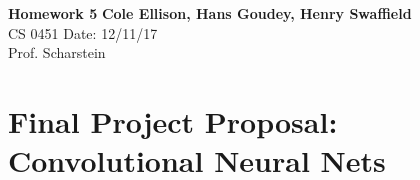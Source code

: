 \documentclass[a4paper, 11pt]{article}
\begin{document}
\noindent
\large\textbf{Homework 5} \hfill \textbf{Cole Ellison, Hans Goudey, Henry Swaffield} \\
\normalsize CS 0451 \hfill Date: 12/11/17\\
Prof. Scharstein \hfill \\

\section*{Final Project Proposal: Convolutional Neural Nets}

\end{document}
